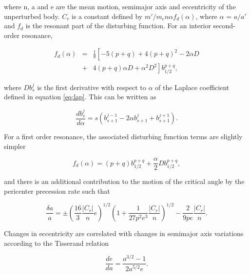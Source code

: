 \documentclass[twocolumn]{aastex63}
\begin{document}
\noindent where n, a and e are the mean motion, semimajor axis and eccentricity of the unperturbed body. $C_{r}$ is a constant defined by 
$m'/m_{c} n \alpha f_{d}(\alpha)$, where $\alpha$ = $a/a'$ and $f_{d}$ is the resonant part of the disturbing function. For an interior second-order 
resonance,

\begin{eqnarray}\label{eq:fd_so}
	f_{d} (\alpha) &=& \frac{1}{8} \left[ -5(p+q) + 4(p+q)^{2} - 2 \alpha D \right. \\ \nonumber
	                      & + & \left. 4(p+q) \alpha D + \alpha^{2} D^{2} \right] b^{p+q}_{1/2},
\end{eqnarray}

\noindent where $D b^{j}_{s}$ is the first derivative with respect to $\alpha$ of the Laplace coefficient defined in equation \ref{eq:lap}. This can 
be written as

\begin{equation}\label{eq:lap_d}
	\frac{d b_{s}^{j}}{d \alpha} = s \left( b_{s+1}^{j-1} - 2 \alpha b_{s+1}^{j} + b_{s+1}^{j+1} \right).
\end{equation}

For a first order resonance, the associated disturbing function terms are slightly simpler

\begin{equation}\label{eq:fd_fo}
	f_{d}(\alpha) = (p+q) b_{1/2}^{p+q} + \frac{\alpha}{2} D b_{1/2}^{p+q},
\end{equation}

\noindent and there is an additional contribution to the motion of the critical angle by the pericenter precession rate such that

\begin{equation}\label{eq:res_fo}
	\frac{\delta a}{a} = \pm \left(\frac{16}{3} \frac{\left| C_{r} \right|}{n} e \right)^{1/2} \left(  1 + \frac{1}{27 p^2 e^3} \frac{\left| C_{r} \right|}{n} 
	\right)^{1/2} - \frac{2}{9 p e}  \frac{\left| C_{r} \right|}{n}.
\end{equation}

Changes in eccentricity are correlated with changes in semimajor axis variations according to the Tisserand relation

\begin{equation}\label{eq:tiss}
	\frac{de}{da} = \frac{a^{3/2} - 1}{2 a^{5/2} e}.
\end{equation}
\end{document}
